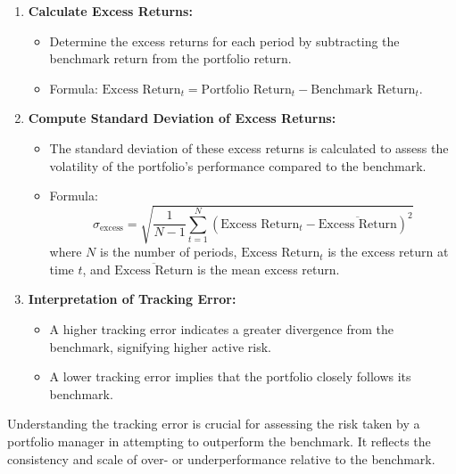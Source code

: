 \documentclass{article}
\begin{document}
\begin{enumerate}
    \item \textbf{Calculate Excess Returns:}
    \begin{itemize}
        \item Determine the excess returns for each period by subtracting the benchmark return from the portfolio return.
        \item Formula: \( \text{Excess Return}_t = \text{Portfolio Return}_t - \text{Benchmark Return}_t \).
    \end{itemize}

    \item \textbf{Compute Standard Deviation of Excess Returns:}
    \begin{itemize}
        \item The standard deviation of these excess returns is calculated to assess the volatility of the portfolio's performance compared to the benchmark.
        \item Formula: 
        \[
        \sigma_{\text{excess}} = \sqrt{\frac{1}{N - 1} \sum_{t=1}^{N} (\text{Excess Return}_t - \overline{\text{Excess Return}})^2}
        \]
        where \( N \) is the number of periods, \( \text{Excess Return}_t \) is the excess return at time \( t \), and \( \overline{\text{Excess Return}} \) is the mean excess return.
    \end{itemize}

    \item \textbf{Interpretation of Tracking Error:}
    \begin{itemize}
        \item A higher tracking error indicates a greater divergence from the benchmark, signifying higher active risk.
        \item A lower tracking error implies that the portfolio closely follows its benchmark.
    \end{itemize}
\end{enumerate}

Understanding the tracking error is crucial for assessing the risk taken by a portfolio manager in attempting to outperform the benchmark. It reflects the consistency and scale of over- or underperformance relative to the benchmark.
\end{document}
